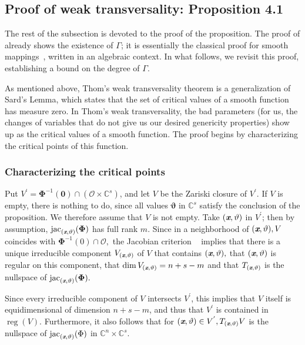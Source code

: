 \documentclass[a4paper]{article}
\def\sO{\mathscr{O}}
\def\thetab{\bm{\vartheta}}
\def\xb{\textit{\textbf{x}}}
\def\vt{\vartheta}
\DeclareMathOperator{\jac}{jac}
\DeclareMathOperator{\reg}{reg}
\def\dt{s}
\def\C{\mathbb{C}}
\begin{document}
\subsection{Proof of weak transversality: Proposition 4.1}
The rest of the subsection is devoted to the proof of the proposition.
The proof of \cite[Theorem B.3]{TWT} already shows the existence of
$\Gamma$; it is essentially the classical proof for smooth
mappings~\cite[Section~3.7]{demazure2000bifurcations}, written in an
algebraic context. In what follows, we revisit this proof,
establishing a bound on the degree of $\Gamma$.

As mentioned above, Thom’s weak transversality theorem is a generalization of Sard’s Lemma, which states that the set of critical values of a smooth function has measure zero. In Thom’s weak transversality, the bad parameters (for us, the changes of variables that do not give us our desired genericity properties) show up as the critical values of a smooth function. The proof begins by characterizing the critical points of this function.

\subsubsection{Characterizing the critical points}
    Put $V^{'} = \bm\Phi^{-1}(\bm 0) \cap (\sO \times \C^s)$, and let $V$ be the Zariski closure of $V^{'}.$ If $V$ is empty, there is nothing to do, since all values $\thetab$ in $\C^\dt$ satisfy the conclusion of the proposition. We therefore assume that $V$ is not empty. Take $(\xb, \vt)$ in $V^{'}$; then by assumption, $\jac_{(\xb,\vt)}({\bm \Phi})$ has full rank $m$. Since in a neighborhood of $(\xb,\vt), V$ coincides with ${\bm \Phi}^{-1}(0) \cap \sO,$ the Jacobian criterion ~\cite[Corollary 16.20]{ECA} implies that there is a unique irreducible component $V_{(\xb,\vt)}$ of $V$ that contains $(\xb,\vt),$ that $(\xb,\vt)$ is regular on this component, that $\dim V_{(\xb,\vt)}=n+s-m$ and that $T_{(\xb,\vt)}$ is the nullspace of $\jac_{(\xb,\vt)}({\bm \Phi}).$
    
    Since every irreducible component of $V$ intersects $V^{'}$, this implies that $V$ itself is equidimensional of dimension $n+s-m$, and thus that $V^{'}$ is contained in $\reg (V)$. Furthermore, it also follows that for $(\xb,\vt) \in V^{'}, T_{(\xb,\vt)}V$ is the nullspace of $\jac_{(\xb,\vt)}(\Phi)$ in $\C^n \times \C^s.$  
    
\end{document}
